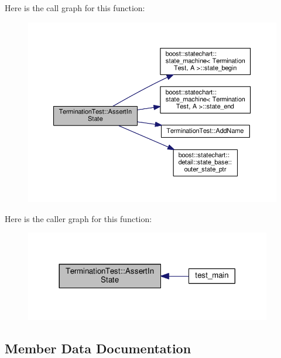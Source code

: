 Here is the call graph for this function\+:
\nopagebreak
\begin{figure}[H]
\begin{center}
\leavevmode
\includegraphics[width=350pt]{struct_termination_test_aec947c03a7b1bfbc20a93cc0e7434381_cgraph}
\end{center}
\end{figure}
Here is the caller graph for this function\+:
\nopagebreak
\begin{figure}[H]
\begin{center}
\leavevmode
\includegraphics[width=305pt]{struct_termination_test_aec947c03a7b1bfbc20a93cc0e7434381_icgraph}
\end{center}
\end{figure}


\subsection{Member Data Documentation}
\mbox{\label{struct_termination_test_ae76341e7ca903c6ec445a1342bfba0a9}} 

